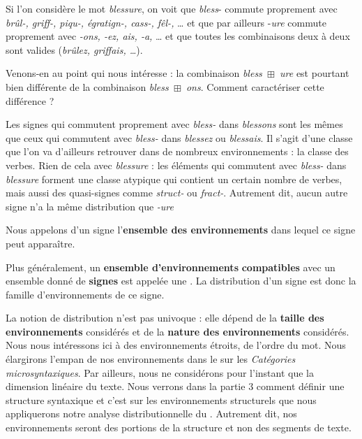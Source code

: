 Si l’on considère le mot \textit{blessure}, on voit que \textit{bless}{}- commute proprement avec \textit{brûl-, griff-, piqu-, égratign-, cass-, fêl-,} … et que par ailleurs -\textit{ure} commute proprement avec \textit{{}-ons, -ez, ais, -a,} … et que toutes les combinaisons deux à deux sont valides (\textit{brûlez, griffais, …}).

Venons-en au point qui nous intéresse : la combinaison \textit{bless~}${\boxplus}$\textit{~ure} est pourtant bien différente de la combinaison \textit{bless~}${\boxplus}$\textit{~ons}. Comment caractériser cette différence ?

Les signes qui commutent proprement avec \textit{bless-} dans \textit{blessons} sont les mêmes que ceux qui commutent avec \textit{bless-} dans \textit{blessez} ou \textit{blessais}. Il s’agit d’une classe que l’on va d’ailleurs retrouver dans de nombreux environnements : la classe des verbes. Rien de cela avec \textit{blessure} : les éléments qui commutent avec \textit{bless-} dans \textit{blessure} forment une classe atypique qui contient un certain nombre de verbes, mais aussi des quasi-signes comme \textit{struct-} ou \textit{fract-}. Autrement dit, aucun autre signe n’a la même distribution que \textit{{}-ure}

\begin{styleLivreImportant}
Nous appelons  d’un signe l’\textbf{ensemble des environnements} dans lequel ce signe peut apparaître.
\end{styleLivreImportant}

\begin{styleLivreImportant}
Plus généralement, un \textbf{ensemble d’environnements} \textbf{compatibles} avec un ensemble donné de \textbf{signes} est appelée une . La distribution d’un signe est donc la famille d’environnements de ce signe.
\end{styleLivreImportant}

La notion de distribution n’est pas univoque : elle dépend de la \textbf{taille des environnements} considérés et de la \textbf{nature des environnements} considérés. Nous nous intéressons ici à des environnements étroits, de l’ordre du mot. Nous élargirons l’empan de nos environnements dans le  sur les \textit{Catégories microsyntaxiques}. Par ailleurs, nous ne considérons pour l’instant que la dimension linéaire du texte. Nous verrons dans la partie 3 comment définir une structure syntaxique et c’est sur les environnements structurels que nous appliquerons notre analyse distributionnelle du . Autrement dit, nos environnements seront des portions de la structure et non des segments de texte.


